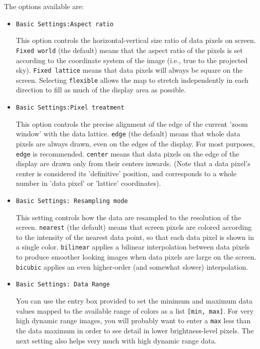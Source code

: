 The options available are:
\begin{itemize}

\item {\tt Basic Settings:Aspect ratio}

This option controls the horizontal-vertical size ratio of data pixels
on screen.  {\tt Fixed world} (the default) means that the aspect
ratio of the pixels is set according to the coordinate system of
the image (i.e., true to the projected sky). {\tt Fixed lattice}
means that data pixels will always be square on the screen.  Selecting
{\tt flexible} allows the map to stretch independently in each
direction to fill as much of the display area as possible.

\item {\tt Basic Settings:Pixel treatment}

This option controls the precise alignment of the edge of the current
'zoom window' with the data lattice.  {\tt edge} (the default) means
that whole data pixels are always drawn, even on the edges of the display.
For most purposes, {\tt edge} is recommended.  {\tt center} means that
data pixels on the edge of the display are drawn only from their centers
inwards. (Note that a data pixel's center is considered its 'definitive'
position, and corresponds to a whole number in 'data pixel' or 'lattice'
coordinates).

\item {\tt Basic Settings: Resampling mode}

This setting controls how the data are resampled to the resolution of
the screen.  {\tt nearest} (the default) means that screen pixels are
colored according to the intensity of the nearest data point, so that
each data pixel is shown in a single color. {\tt bilinear} applies a
bilinear interpolation between data pixels to produce smoother looking images
when data pixels are large on the screen.  {\tt bicubic} applies an
even higher-order (and somewhat slower) interpolation.

\item {\tt Basic Settings: Data Range}

You can use the entry box provided to set the minimum and maximum data values
mapped to the available range of colors as a list {\tt [min, max]}.  
For very high dynamic range images,
you will probably want to enter a {\tt max} less than the data maximum 
in order to see detail in lower brightness-level pixels.
The next setting also helps very much with high dynamic range data.


\end{itemize}
